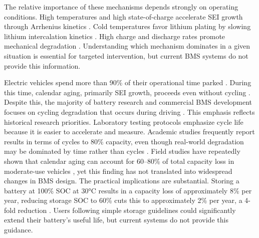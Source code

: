 \documentclass[5p,times,authoryear]{elsarticle}
\begin{document}
The relative importance of these mechanisms depends strongly on operating conditions. High temperatures and high state-of-charge accelerate SEI growth through Arrhenius kinetics \citep{schmalstieg2014electrochemical}. Cold temperatures favor lithium plating by slowing lithium intercalation kinetics \citep{waldmann2014temperature}. High charge and discharge rates promote mechanical degradation \citep{reniers2019review}. Understanding which mechanism dominates in a given situation is essential for targeted intervention, but current BMS systems do not provide this information.


Electric vehicles spend more than 90\% of their operational time parked \citep{barre2013review}. During this time, calendar aging, primarily SEI growth, proceeds even without cycling \citep{schimpe2018comprehensive}. Despite this, the majority of battery research and commercial BMS development focuses on cycling degradation that occurs during driving \citep{sulzer2021challenge}.
This emphasis reflects historical research priorities. Laboratory testing protocols emphasize cycle life because it is easier to accelerate and measure. Academic studies frequently report results in terms of cycles to 80\% capacity, even though real-world degradation may be dominated by time rather than cycles \citep{birkl2017degradation}. Field studies have repeatedly shown that calendar aging can account for 60--80\% of total capacity loss in moderate-use vehicles \citep{saxena2019quantifying}, yet this finding has not translated into widespread changes in BMS design.
The practical implications are substantial. Storing a battery at 100\% SOC at 30°C results in a capacity loss of approximately 8\% per year, reducing storage SOC to 60\% cuts this to approximately 2\% per year, a 4-fold reduction \citep{schimpe2018comprehensive}. Users following simple storage guidelines could significantly extend their battery's useful life, but current systems do not provide this guidance.

\end{document}
